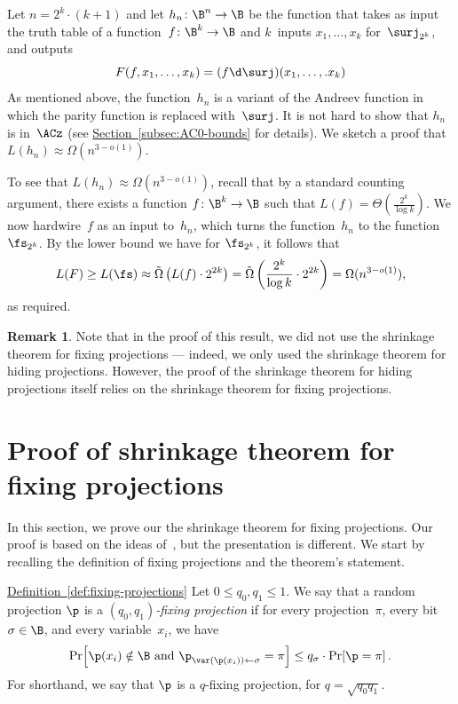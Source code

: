 \documentclass[11pt]{article}
\numberwithin{equation}{section}
\theoremstyle{definition}
\newtheorem{remark}[theorem]{Remark}
\theoremstyle{plain}
\newcommand{\expref}[2]{\hyperref[#2]{#1~\ref{#2}}}
\theoremstyle{definition}\newtheorem{notation}[theorem]{Notation}\theoremstyle{plain}
\begin{document}
Let $n=2^{k}\cdot(k+1)$ and let $h_{n}\colon\B^{n}\to\B$ be the function
that takes as input the truth table of a function~$f\colon\B^{k}\to\B$
and $k$~inputs $x_{1},\ldots,x_{k}$ for~$\surj_{2^{k}}$, and
outputs
\[
F(f,x_{1},\ldots,x_{k})=(f\d\surj)(x_{1},\ldots,.x_{k})
\]
As mentioned above, the function~$h_{n}$ is a variant of the Andreev
function in which the parity function is replaced with~$\surj$.
It is not hard to show that $h_{n}$ is in~$\ACz$ (see \expref{Section}{subsec:AC0-bounds}
for details). We sketch a proof that $L(h_{n})\approx\Omega(n^{3-o(1)})$.

To see that $L(h_{n})\approx\Omega(n^{3-o(1)})$, recall that by a
standard counting argument, there exists a function $f\colon\B^{k}\to\B$
such that $L(f)=\Theta\left(\frac{2^{k}}{\log k}\right)$. We now
hardwire~$f$ as an input to~$h_{n}$, which turns the function~$h_{n}$
to the function~$\fs_{2^{k}}$. By the lower bound we have for $\fs_{2^{k}}$,
it follows that
\[
L(F)\ge L(\fs)\approx\tilde{\Omega}\left(L(f)\cdot2^{2k}\right)=\tilde{\Omega}\left(\frac{2^{k}}{\log k}\cdot2^{2k}\right)=\Omega(n^{3-o(1)}),
\]
as required.
\begin{remark}
Note that in the proof of this result, we did not use the shrinkage
theorem for fixing projections --- indeed, we only used the shrinkage
theorem for hiding projections. However, the proof of the shrinkage
theorem for hiding projections itself relies on the shrinkage theorem for fixing
projections.
\end{remark}



\section{\label{sec:shrinkage-fixing}Proof of shrinkage theorem for fixing
projections}

In this section, we prove our the shrinkage theorem for fixing projections.
Our proof is based on the ideas of~\cite{H98}, but the presentation
is different. We start by recalling the definition of fixing projections
and the theorem's statement.
\begin{repdefinition}{\expref{Definition}{def:fixing-projections}}
Let $0\le q_{0},q_{1}\le1$. We say that a random projection $\p$
is a \emph{$(q_{0},q_{1})$-fixing projection} if for every projection~$\pi$,
every bit $\sigma\in\B$, and every variable~$x_{i}$, we have
\[
\Pr\!\left[\p(x_{i})\notin\B\text{ and }\p_{\var(\p(x_{i}))\gets\sigma}=\pi\right]\le q_{\sigma}\cdot\Pr\!\left[\p=\pi\right].
\]
For shorthand, we say that $\p$ is a $q$-fixing projection, for
$q=\sqrt{q_{0}q_{1}}$. 
\end{repdefinition}
\end{document}
